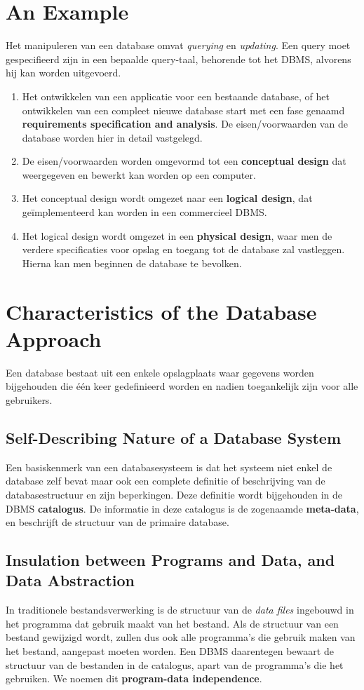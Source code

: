 \section{An Example}
Het manipuleren van een database omvat \textit{querying} en \textit{updating}.
Een query moet gespecifieerd zijn in een bepaalde query-taal, behorende tot het DBMS, alvorens hij kan worden uitgevoerd.
\begin{enumerate}
 \item Het ontwikkelen van een applicatie voor een bestaande database, of het ontwikkelen van een compleet nieuwe database start met een fase genaamd \textbf{requirements specification and analysis}. De eisen/voorwaarden van de database worden hier in detail vastgelegd.
 \item De eisen/voorwaarden worden omgevormd tot een \textbf{conceptual design} dat weergegeven en bewerkt kan worden op een computer.
 \item Het conceptual design wordt omgezet naar een \textbf{logical design}, dat ge\"implementeerd kan worden in een commercieel DBMS.
 \item Het logical design wordt omgezet in een \textbf{physical design}, waar men de verdere specificaties voor opslag en toegang tot de database zal vastleggen. Hierna kan men beginnen de database te bevolken. 
\end{enumerate}

\section{Characteristics of the Database Approach}
Een database bestaat uit een enkele opslagplaats waar gegevens worden bijgehouden die \'e\'en keer gedefinieerd worden en nadien toegankelijk zijn voor alle gebruikers. 

\subsection{Self-Describing Nature of a Database System}
Een basiskenmerk van een databasesysteem is dat het systeem niet enkel de database zelf bevat maar ook een complete definitie of beschrijving van de databasestructuur en zijn beperkingen. Deze definitie wordt bijgehouden in de DBMS \textbf{catalogus}. De informatie in deze catalogus is de zogenaamde \textbf{meta-data}, en beschrijft de structuur van de primaire database.

\subsection{Insulation between Programs and Data, and Data Abstraction}
In traditionele bestandsverwerking is de structuur van de \textit{data files} ingebouwd in het programma dat gebruik maakt van het bestand. Als de structuur van een bestand gewijzigd wordt, zullen dus ook alle programma's die gebruik maken van het bestand, aangepast moeten worden. Een DBMS daarentegen bewaart de structuur van de bestanden in de catalogus, apart van de programma's die het gebruiken. We noemen dit \textbf{program-data independence}. 

